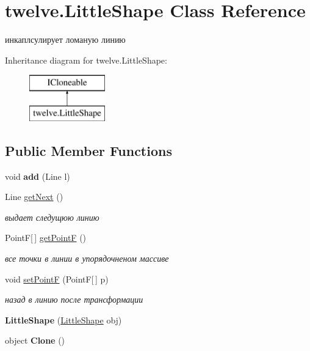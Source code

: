 \hypertarget{classtwelve_1_1_little_shape}{}\section{twelve.\+Little\+Shape Class Reference}
\label{classtwelve_1_1_little_shape}


инкаплсулирует ломаную линию  


Inheritance diagram for twelve.\+Little\+Shape\+:\begin{figure}[H]
\begin{center}
\leavevmode
\includegraphics[height=2.000000cm]{classtwelve_1_1_little_shape}
\end{center}
\end{figure}
\subsection*{Public Member Functions}
\begin{DoxyCompactItemize}
\item 
\hypertarget{classtwelve_1_1_little_shape_aac507ba1a6214fce9a2857804fafabcf}{}void {\bfseries add} (Line l)\label{classtwelve_1_1_little_shape_aac507ba1a6214fce9a2857804fafabcf}

\item 
Line \hyperlink{classtwelve_1_1_little_shape_a824f2bd97f3ddd24731c469d23d03231}{get\+Next} ()
\begin{DoxyCompactList}\small\item\em выдает следущюю линию \end{DoxyCompactList}\item 
Point\+F\mbox{[}$\,$\mbox{]} \hyperlink{classtwelve_1_1_little_shape_acbc95b796f87111791079e7251bf204c}{get\+Point\+F} ()
\begin{DoxyCompactList}\small\item\em все точки в линии в упорядочненом массиве \end{DoxyCompactList}\item 
void \hyperlink{classtwelve_1_1_little_shape_aaa59136e3578ebf787caf75f8b1c46e9}{set\+Point\+F} (Point\+F\mbox{[}$\,$\mbox{]} p)
\begin{DoxyCompactList}\small\item\em назад в линию после трансформации \end{DoxyCompactList}\item 
\hypertarget{classtwelve_1_1_little_shape_a4a8f5f965efe82ee86b31fe9ded181d9}{}{\bfseries Little\+Shape} (\hyperlink{classtwelve_1_1_little_shape}{Little\+Shape} obj)\label{classtwelve_1_1_little_shape_a4a8f5f965efe82ee86b31fe9ded181d9}

\item 
\hypertarget{classtwelve_1_1_little_shape_a54b1df32bdb8908653e9af3142ed61c3}{}object {\bfseries Clone} ()\label{classtwelve_1_1_little_shape_a54b1df32bdb8908653e9af3142ed61c3}

\end{DoxyCompactItemize}
